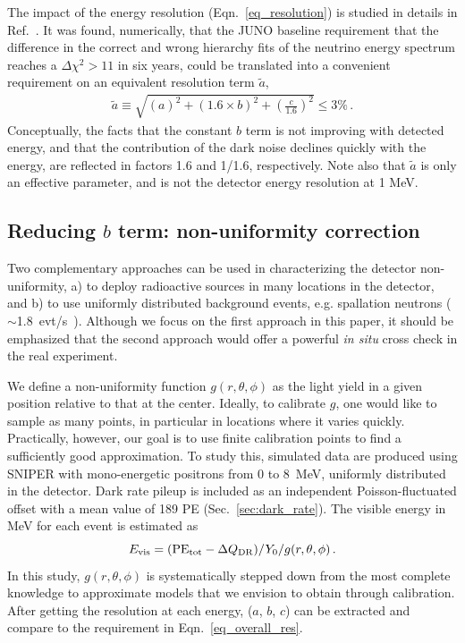 \documentclass[a4paper,10pt,twoside]{cpc-hepnp}
\begin{document}
\begin{CJK*}{GB}{gbsn}
\begin{multicols}{2}
The impact of the energy resolution (Eqn.~\ref{eq_resolution}) is
studied in details in Ref.~\cite{yellow-book}. It was found,
numerically, that the JUNO baseline requirement that the difference in
the correct and wrong hierarchy fits of the neutrino energy spectrum
reaches a $\Delta\chi^2>11$ in six years, could be translated into a convenient
requirement on an equivalent resolution term $\tilde{a}$, 
\begin{eqnarray}
\label{eq_overall_res}
\tilde{a} \equiv \sqrt{(a)^{2}+(1.6 \times b)^{2}+\left(\frac{c}{1.6}\right)^{2}} \leqslant 3 \%\,.
\end{eqnarray}
Conceptually, the facts that the constant $b$ term is not improving
with detected energy, and that the contribution of the dark noise
declines quickly with the energy, are reflected in factors 1.6 and
1/1.6, respectively. Note also that $\tilde{a}$ is only an effective
parameter, and is not the detector energy resolution at 1 MeV.

\subsection{Reducing $b$ term: non-uniformity correction}
\label{sec:non-uni}
Two complementary approaches can be used in characterizing the
detector non-uniformity, a) to deploy radioactive sources in many
locations in the detector, and b) to use uniformly distributed
background events, e.g. spallation neutrons
($\sim$1.8~evt/s~\cite{yellow-book}). Although we focus on the first
approach in this paper, it should be emphasized that the second
approach would offer a powerful {\it in situ} cross check in the real
experiment.

We define a non-uniformity function $g(r,\theta,\phi)$ as the light
yield in a given position relative to that at the center.  Ideally, to
calibrate $g$, one would like to sample as many points, in particular
in locations where it varies quickly. Practically, however, our goal
is to use finite calibration points to find a sufficiently good
approximation. To study this, simulated data are produced using SNIPER
with mono-energetic positrons from 0 to 8~MeV, uniformly distributed in
the detector. Dark rate pileup is included as an independent
Poisson-fluctuated offset with a mean value of 189 PE
(Sec.~\ref{sec:dark_rate}). The visible energy in MeV for each event
is estimated as
\begin{equation}
\label{eq_E_rec}
E_{\rm vis} = ({\rm PE_{\rm tot}}-\Delta Q_{\rm DR})/Y_0/g(r,\theta,\phi)\,.
\end{equation}
In this study, $g(r,\theta,\phi)$ is systematically stepped down from the most
complete knowledge to approximate models that we envision to obtain
through calibration. After getting the resolution at each energy,
($a$, $b$, $c$) can be extracted and compare to the requirement in
Eqn.~\ref{eq_overall_res}.


\end{multicols}
\end{CJK*}
\end{document}
